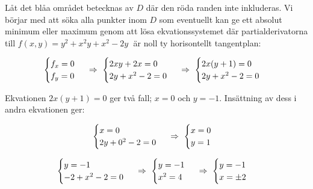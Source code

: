\documentclass{article}
\begin{document}
\begin{figure}[h]
    \center
\end{figure}

Låt det blåa området betecknas av $D$ där den röda randen inte inkluderas. Vi börjar med att söka alla punkter inom $D$ som eventuellt kan ge ett absolut minimum eller maximum genom att lösa ekvationssystemet där partialderivatorna till $f(x, y)=y^2+x^2y+x^2-2y\;$ är noll ty horisontellt tangentplan:

$$
\begin{cases}
    f_{x}=0 \\
    f_{y}=0 
\end{cases}
\ \Rightarrow \ 
\begin{cases}
    2xy+2x=0 \\
    2y+x^2-2=0
\end{cases}
\ \Rightarrow \ 
\begin{cases}
    2x(y+1)=0 \\
    2y+x^2-2=0
\end{cases}
$$

\vskip 0.2cm

Ekvationen $2x(y+1)=0$ ger två fall; $x=0$ och $y=-1$. Insättning av dess i andra ekvationen ger:

$$
\begin{cases}
    x=0 \\
    2y+0^2-2=0
\end{cases}
\ \Rightarrow \ 
\begin{cases}
    x=0 \\
    y=1
\end{cases}
$$

\vskip 0.2cm

$$
\begin{cases}
    y=-1 \\
    -2+x^2-2=0
\end{cases}
\ \Rightarrow \ 
\begin{cases}
    y=-1 \\
    x^2=4
\end{cases}
\ \Rightarrow \ 
\begin{cases}
    y=-1 \\
    x=\pm2
\end{cases}
$$
\end{document}
